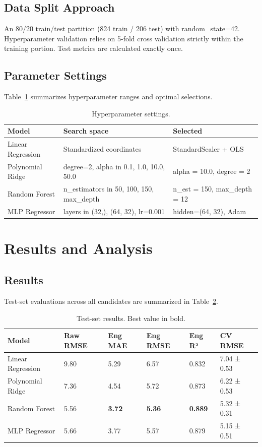\documentclass[conference]{IEEEtran}
\begin{document}
\subsection{Data Split Approach}
An 80/20 train/test partition (824 train / 206 test) with random_state=42. Hyperparameter validation relies on 5-fold cross validation strictly within the training portion. Test metrics are calculated exactly once.

\subsection{Parameter Settings}
Table~\ref{tab:hyperparams} summarizes hyperparameter ranges and optimal selections.

\begin{table}[htbp]
\caption{Hyperparameter settings.}
\label{tab:hyperparams}
\centering
\begin{tabular}{lll}
\toprule
\textbf{Model} & \textbf{Search space} & \textbf{Selected} \\
\midrule
Linear Regression & Standardized coordinates & StandardScaler + OLS \\
Polynomial Ridge & degree=2, alpha in {0.1, 1.0, 10.0, 50.0} & alpha = 10.0, degree = 2 \\
Random Forest & n_estimators in {50, 100, 150}, max_depth & n_est = 150, max_depth = 12 \\
MLP Regressor & layers in {(32,), (64, 32)}, lr=0.001 & hidden=(64, 32), Adam \\
\bottomrule
\end{tabular}
\end{table}

\section{Results and Analysis}
\subsection{Results}
Test-set evaluations across all candidates are summarized in Table~\ref{tab:results}.

\begin{table}[htbp]
\caption{Test-set results. Best value in bold.}
\label{tab:results}
\centering
\begin{tabular}{llllll}
\toprule
\textbf{Model} & \textbf{Raw RMSE} & \textbf{Eng MAE} & \textbf{Eng RMSE} & \textbf{Eng R²} & \textbf{CV RMSE} \\
\midrule
Linear Regression & 9.80 & 5.29 & 6.57 & 0.832 & 7.04 ± 0.53 \\
Polynomial Ridge & 7.36 & 4.54 & 5.72 & 0.873 & 6.22 ± 0.53 \\
Random Forest & 5.56 & \textbf{3.72} & \textbf{5.36} & \textbf{0.889} & 5.32 ± 0.31 \\
MLP Regressor & 5.66 & 3.77 & 5.57 & 0.879 & 5.15 ± 0.51 \\
\bottomrule
\end{tabular}
\end{table}
\end{document}
